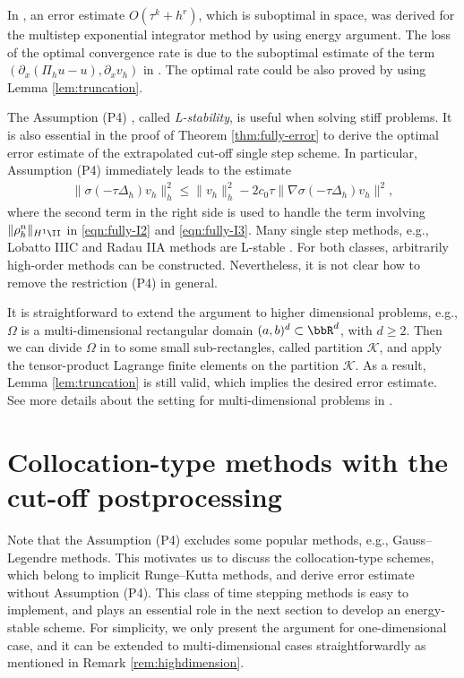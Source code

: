 \begin{remark}\label{rem:optimal-LiYangZhou}
In \cite{LiYangZhou:sisc}, an error estimate $O(\tau^k + h^r)$,
which is  suboptimal in space, was derived
for the multistep exponential integrator method by using energy argument.
The loss of the optimal convergence rate is due to the
suboptimal estimate of the term $(\partial_x(\Pi_h u  -  u), \partial_x v_h)$
in \cite[eq. (2.6) and (3.22)]{LiYangZhou:sisc}. The optimal rate could be also
proved by using Lemma \ref{lem:truncation}.


The Assumption (P4) , called
\textsl{L-stability}, is useful when solving stiff problems.
It is also essential in the proof of Theorem \ref{thm:fully-error} to derive the optimal error estimate
of the extrapolated cut-off single step scheme. In particular,
Assumption (P4) immediately leads to the estimate
\begin{align*}
 \|  \sigma(-\tau\Delta_h) v_h \|_h^2 \le \|  v_h \|_h^2 - 2c_0\tau \| \nabla \sigma(-\tau\Delta_h) v_h\|^2,
\end{align*}
where the second term in the right side is used to handle the term involving $\|  \rho_h^n \|_{H^1\II}$
in \eqref{eqn:fully-I2} and \eqref{eqn:fully-I3}.
Many single step methods, e.g., Lobatto IIIC and Radau IIA methods are L-stable \cite{Ehle:thesis,HairerWanner:2010}.
For both classes, arbitrarily high-order methods can be constructed.
Nevertheless, it is not clear how to remove the restriction (P4) in general.
\end{remark}

\begin{remark}\label{rem:highdimension}
It is straightforward to extend the argument to higher dimensional problems, e.g., $\Omega$ is
a multi-dimensional rectangular domain $(a, b)^d \subset\bbR^d$, with $d\ge 2$.
Then we can divide $\Omega$ in to some small sub-rectangles, called partition $\mathcal{K}$,
and  apply the tensor-product Lagrange finite elements on the partition $\mathcal{K}$.
As a result, Lemma \ref{lem:truncation} is still valid, which implies the desired error estimate.
See more details about the setting for multi-dimensional problems in \cite[Section 2.2]{LiYangZhou:sisc}.
\end{remark}



\section{Collocation-type methods with the cut-off postprocessing}\label{sec:collocation}
Note that the Assumption (P4) excludes some
popular methods, e.g., Gauss--Legendre methods.
This motivates us to discuss the collocation-type schemes,
which belong to implicit Runge--Kutta methods, and derive error estimate without Assumption (P4).
This class of time stepping methods is easy to implement,
and plays an essential role in the next section to develop an energy-stable scheme.
For simplicity, we only present the argument for one-dimensional case,
and it can be extended to multi-dimensional cases straightforwardly as mentioned in Remark \ref{rem:highdimension}.

